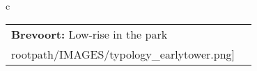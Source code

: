 \begin{table}[H]
        \begin{tabular}{c}
        \begin{tabular}{m{1.5in} m{2in}}
\textbf{Brevoort:} {Low-rise in the park} & \texttt{[image: \\rootpath/IMAGES/typology\_earlytower.png]}
\end{tabular}\end{tabular}
        \end{table}
